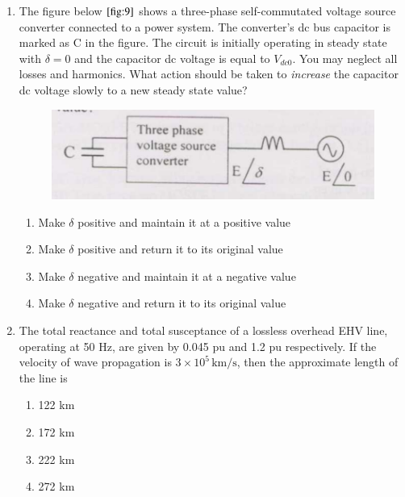 \documentclass[journal]{IEEEtran}
\numberwithin{equation}{enumi}
\numberwithin{figure}{enumi}
\begin{document}
\begin{enumerate}
\begin{multicols}{4}
\begin{enumerate}
   \end{enumerate}
   \end{multicols}
   \bigskip
   \item The figure below $\ref{fig:9}$ shows a three-phase self-commutated voltage source converter connected to a power system. The converter's dc bus capacitor is marked as C in the figure. The circuit is initially operating in steady state with $\delta = 0$ and the capacitor dc voltage is equal to $V_{dc0}$. You may neglect all losses and harmonics. What action should be taken to \textit{increase} the capacitor dc voltage slowly to a new steady state value?
   \begin{figure}[!ht]
    \centering
    \includegraphics[width=\linewidth]{figs/9.png}
    \caption{}
    \label{fig:9}
   \end{figure}
   \begin{multicols}{2}
   \begin{enumerate}
        \item Make $\delta$ positive and maintain it at a positive value
        \item Make $\delta$ positive and return it to its original value
        \item Make $\delta$ negative and maintain it at a negative value
        \item Make $\delta$ negative and return it to its original value
    \end{enumerate}
    \end{multicols}
    \bigskip
    \item The total reactance and total susceptance of a lossless overhead EHV line, operating at 50 Hz, are given by 0.045 pu and 1.2 pu respectively. If the velocity of wave propagation is $3 \times 10^5 \, \text{km/s}$, then the approximate length of the line is
    \begin{multicols}{4}
    \begin{enumerate}
        \item 122 km
        \item 172 km
        \item 222 km
        \item 272 km

\end{enumerate}
\end{multicols}
\end{enumerate}
\end{document}
